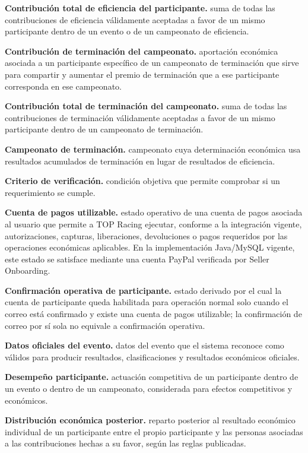 \documentclass[10pt,letterpaper]{article}
\begin{document}
\noindent\textbf{Contribución total de eficiencia del participante.} suma de todas las contribuciones de eficiencia válidamente aceptadas a favor de un mismo participante dentro de un evento o de un campeonato de eficiencia.\par
\noindent\textbf{Contribución de terminación del campeonato.} aportación económica asociada a un participante específico de un campeonato de terminación que sirve para compartir y aumentar el premio de terminación que a ese participante corresponda en ese campeonato.\par
\noindent\textbf{Contribución total de terminación del campeonato.} suma de todas las contribuciones de terminación válidamente aceptadas a favor de un mismo participante dentro de un campeonato de terminación.\par
\noindent\textbf{Campeonato de terminación.} campeonato cuya determinación económica usa resultados acumulados de terminación en lugar de resultados de eficiencia.\par
\noindent\textbf{Criterio de verificación.} condición objetiva que permite comprobar si un requerimiento se cumple.\par
\noindent\textbf{Cuenta de pagos utilizable.} estado operativo de una cuenta de pagos asociada al usuario que permite a TOP Racing ejecutar, conforme a la integración vigente, autorizaciones, capturas, liberaciones, devoluciones o pagos requeridos por las operaciones económicas aplicables. En la implementación Java/MySQL vigente, este estado se satisface mediante una cuenta PayPal verificada por Seller Onboarding.\par
\noindent\textbf{Confirmación operativa de participante.} estado derivado por el cual la cuenta de participante queda habilitada para operación normal solo cuando el correo está confirmado y existe una cuenta de pagos utilizable; la confirmación de correo por sí sola no equivale a confirmación operativa.\par
\noindent\textbf{Datos oficiales del evento.} datos del evento que el sistema reconoce como válidos para producir resultados, clasificaciones y resultados económicos oficiales.\par
\noindent\textbf{Desempeño participante.} actuación competitiva de un participante dentro de un evento o dentro de un campeonato, considerada para efectos competitivos y económicos.\par
\noindent\textbf{Distribución económica posterior.} reparto posterior al resultado económico individual de un participante entre el propio participante y las personas asociadas a las contribuciones hechas a su favor, según las reglas publicadas.\par
\end{document}
